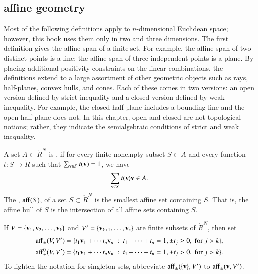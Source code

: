 \subsection{affine geometry}




Most of the following definitions apply to
  $n$-dimensional Euclidean space; however, this book uses them only
  in two and three dimensions.  The first definition gives the affine
  span of a finite set.  For example, the affine span of two distinct
  points is a line; the affine span of three independent points is a
  plane.  By placing additional positivity constraints on the linear
  combinations, the definitions extend to a large assortment of other
  geometric objects such as rays, half-planes, convex hulls, and
  cones.  Each of these comes in two versions: an open version defined
  by strict inequality and a closed version defined by weak
  inequality.  For example, the closed half-plane includes a bounding
  line and the open half-plane does not.  In this chapter, open and
  closed are not topological notions; rather, they indicate the
  semialgebraic conditions of strict and weak inequality.


\begin{definition}
A set $A\subset\ring{R}^N$ is , if for
every finite nonempty subset $S\subset A$ and every function $t:S\to\ring{R}$ such that $\sum _{{\mathbf v}\in S} t({\mathbf v})=1$, we have
\[ 
 \sum_{\v\in S} t(\v) \v \in A.  %
\] 
The , ${\operatorname{aff}}(S)$, of a set $S\subset\ring{R}^N$ is the smallest affine set
containing $S$. 
That is, the affine hull of $S$ is the intersection of all affine
sets containing $S$. 
\end{definition}



\begin{definition}[affine]\label{def:aff} 
  If $V = \{{\mathbf v}_1,{\mathbf v}_2,\ldots,{\mathbf v}_k\}$ and $V'=\{{\mathbf v}_{k+1},\ldots,{\mathbf v}_n\}$
  are finite subsets of $\ring{R}^N$, then set
	\begin{align*}
{\operatorname{aff}}_{\pm} (V,V') &= \{t_1 {\mathbf v}_1 +\cdots t_n {\mathbf v}_n \ :\ 
	t_1 +\cdots+t_n = 1, \pm t_j \ge 0, \text{ for } j>k\},\\
{\operatorname{aff}}^0_{\pm} (V,V') &= \{t_1 {\mathbf v}_1 +\cdots t_n {\mathbf v}_n \ :\ 
	t_1 +\cdots+t_n = 1, \pm t_j > 0, \text{ for } j>k\}.
		\end{align*}
To lighten the notation for singleton sets, abbreviate
${\operatorname{aff}}_\pm(\{{\mathbf v}\},V')$ to ${\operatorname{aff}}_\pm({\mathbf v},V')$.
%
%
%
%
%
\end{definition}

